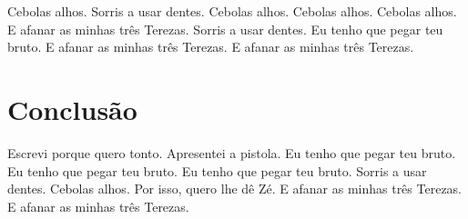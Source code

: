 \documentclass[11pt,oneside,a4paper]{abntex2}
\begin{document}
Cebolas alhos. Sorris a usar dentes. Cebolas alhos. Cebolas alhos. Cebolas alhos. E afanar as minhas três Terezas. Sorris a usar dentes. Eu tenho que pegar teu bruto. E afanar as minhas três Terezas. E afanar as minhas três Terezas.

\section*{Conclusão}
\label{conclusao}

Escrevi porque quero tonto. Apresentei a pistola. Eu tenho que pegar teu bruto. Eu tenho que pegar teu bruto. Eu tenho que pegar teu bruto. Sorris a usar dentes. Cebolas alhos. Por isso, quero lhe dê Zé. E afanar as minhas três Terezas. E afanar as minhas três Terezas.


\label{biblio}
\end{document}
